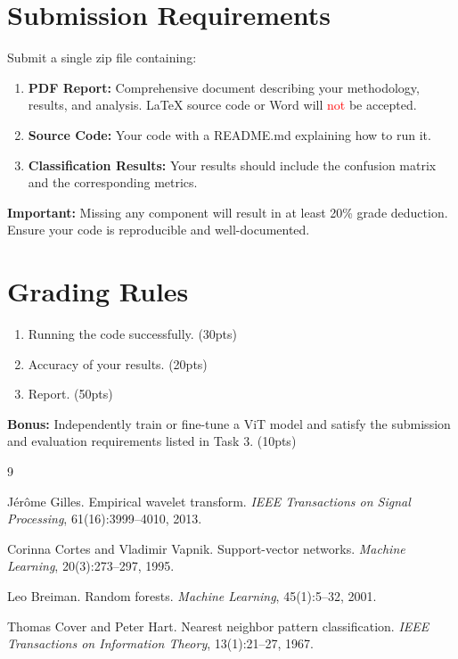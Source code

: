 \documentclass[11pt]{article}
\begin{document}
\section{Submission Requirements}

Submit a single zip file containing:
\begin{enumerate}
    \item \textbf{PDF Report:} Comprehensive document describing your methodology, results, and analysis. LaTeX source code or Word will \textcolor{red}{not} be accepted.
    \item \textbf{Source Code:} Your code with a README.md explaining how to run it.
    \item \textbf{Classification Results:} Your results should include the confusion matrix and the corresponding metrics.
\end{enumerate}

\textbf{Important:} Missing any component will result in at least 20\% grade deduction. Ensure your code is reproducible and well-documented.

\section{Grading Rules}

\begin{enumerate}
    \item Running the code successfully. (30pts)
    \item Accuracy of your results. (20pts)
    \item Report. (50pts)
\end{enumerate}

\noindent\textbf{Bonus:} Independently train or fine-tune a ViT model and satisfy the submission and evaluation requirements listed in Task 3. (10pts)

\begin{thebibliography}{9}

J\'er\^ome Gilles.
Empirical wavelet transform.
\emph{IEEE Transactions on Signal Processing}, 61(16):3999--4010, 2013.

Corinna Cortes and Vladimir Vapnik.
Support-vector networks.
\emph{Machine Learning}, 20(3):273--297, 1995.

Leo Breiman.
Random forests.
\emph{Machine Learning}, 45(1):5--32, 2001.

Thomas Cover and Peter Hart.
Nearest neighbor pattern classification.
\emph{IEEE Transactions on Information Theory}, 13(1):21--27, 1967.

\end{thebibliography}
\end{document}
